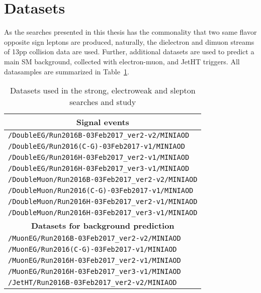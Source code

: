 \section{Datasets}
\label{sec:samplesObjects}
As the searches presented in this thesis has the commonality that two same flavor opposite sign leptons are produced, naturally, the dielectron and dimuon streams of 13\TeV pp collision data are used.
Further, additional datasets are used to predict a main SM background, collected with electron-muon, \ptmiss and JetHT triggers. 
All datasamples are summarized in Table~\ref{tab:datasets}.  
\begin{table}[ht!]
\def\arraystretch{1.2}
    \caption{Datasets used in the strong, electroweak and slepton searches and \ptmiss study}
    \label{tab:datasets}
    \begin{center}
        \begin{tabular}{ l}
        \hline\hline 
        \multicolumn{1}{c}{\textbf{Signal events}} \\
        \hline
        \texttt{/DoubleEG/Run2016B-03Feb2017\_ver2-v2/MINIAOD}    \\
        \texttt{/DoubleEG/Run2016(C-G)-03Feb2017-v1/MINIAOD}     \\
        \texttt{/DoubleEG/Run2016H-03Feb2017\_ver2-v1/MINIAOD}    \\
        \texttt{/DoubleEG/Run2016H-03Feb2017\_ver3-v1/MINIAOD}    \\
        \texttt{/DoubleMuon/Run2016B-03Feb2017\_ver2-v2/MINIAOD}   \\
        \texttt{/DoubleMuon/Run2016(C-G)-03Feb2017-v1/MINIAOD}  \\
        \texttt{/DoubleMuon/Run2016H-03Feb2017\_ver2-v1/MINIAOD}    \\
        \texttt{/DoubleMuon/Run2016H-03Feb2017\_ver3-v1/MINIAOD}   \\
        \hline        
        \multicolumn{1}{c}{\textbf{Datasets for background prediction}} \\
        \hline
        \texttt{/MuonEG/Run2016B-03Feb2017\_ver2-v2/MINIAOD}    \\
        \texttt{/MuonEG/Run2016(C-G)-03Feb2017-v1/MINIAOD}    \\
        \texttt{/MuonEG/Run2016H-03Feb2017\_ver2-v1/MINIAOD}    \\
        \texttt{/MuonEG/Run2016H-03Feb2017\_ver3-v1/MINIAOD}    \\           
        \texttt{/JetHT/Run2016B-03Feb2017\_ver2-v2/MINIAOD}   \\

\end{tabular}
\end{center}
\end{table}
